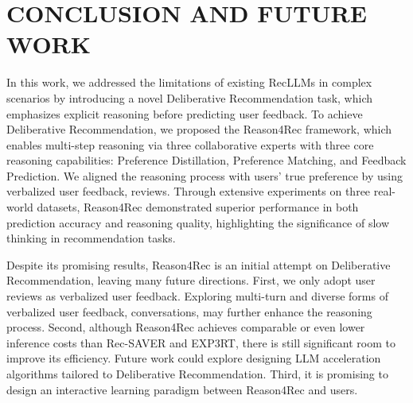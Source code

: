 \section{CONCLUSION AND FUTURE WORK}

In this work, we addressed the limitations of existing RecLLMs in complex scenarios by introducing a novel Deliberative Recommendation task, which emphasizes explicit reasoning before predicting user feedback. 
To achieve Deliberative Recommendation, we proposed the Reason4Rec framework, which enables multi-step reasoning via three collaborative experts with three core reasoning capabilities: Preference Distillation, Preference Matching, and Feedback Prediction. 
We aligned the reasoning process with users' true preference by using verbalized user feedback, \ie reviews. 
Through extensive experiments on three real-world datasets, Reason4Rec demonstrated superior performance in both prediction accuracy and reasoning quality, highlighting the significance of slow thinking in recommendation tasks.



Despite its promising results, Reason4Rec is an initial attempt on Deliberative Recommendation, leaving many future directions. 
First, we only adopt user reviews as verbalized user feedback. Exploring multi-turn and diverse forms of verbalized user feedback, \eg conversations, may further enhance the reasoning process. 
Second, although Reason4Rec achieves comparable or even lower inference costs than Rec-SAVER and EXP3RT, there is still significant room to improve its efficiency. Future work could explore designing LLM acceleration algorithms tailored to Deliberative Recommendation. 
Third, it is promising to design an interactive learning paradigm between Reason4Rec and users. 